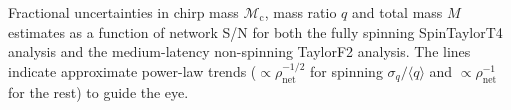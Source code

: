 \label{fig:Mc_q_std_snr} Fractional uncertainties in chirp mass $\mathcal{M}_\mathrm{c}$, mass ratio $q$ and total mass $M$ estimates as a function of network S/N for both the fully spinning SpinTaylorT4 analysis and the medium-latency non-spinning TaylorF2 analysis. The lines indicate approximate power-law trends ($\propto \rho_\mathrm{net}^{-1/2}$ for spinning $\sigma_q/\langle q\rangle$ and $\propto \rho_\mathrm{net}^{-1}$ for the rest) to guide the eye.
  
